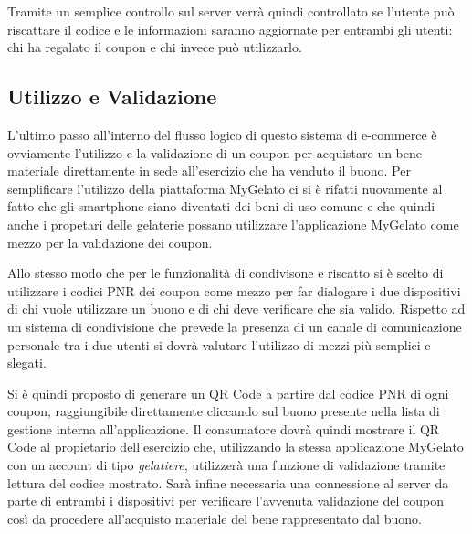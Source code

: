 Tramite un semplice controllo sul server verrà quindi controllato
se l'utente può riscattare il codice e le informazioni saranno aggiornate
per entrambi gli utenti: chi ha regalato il coupon e chi invece può
utilizzarlo.

\subsection{Utilizzo e Validazione}

L'ultimo passo all'interno del flusso logico di questo sistema di
e-commerce è ovviamente l'utilizzo e la validazione di un coupon per
acquistare un bene materiale direttamente in sede all'esercizio che
ha venduto il buono. Per semplificare l'utilizzo della piattaforma
MyGelato ci si è rifatti nuovamente al fatto che gli smartphone siano
diventati dei beni di uso comune e che quindi anche i propetari delle
gelaterie possano utilizzare l'applicazione MyGelato come mezzo per
la validazione dei coupon.\bigskip{}

Allo stesso modo che per le funzionalità di condivisone e riscatto
si è scelto di utilizzare i codici PNR dei coupon come mezzo per far
dialogare i due dispositivi di chi vuole utilizzare un buono e di
chi deve verificare che sia valido. Rispetto ad un sistema di condivisione
che prevede la presenza di un canale di comunicazione personale tra
i due utenti si dovrà valutare l'utilizzo di mezzi più semplici e
slegati.

Si è quindi proposto di generare un QR Code a partire dal codice PNR
di ogni coupon, raggiungibile direttamente cliccando sul buono presente
nella lista di gestione interna all'applicazione. Il consumatore dovrà
quindi mostrare il QR Code al propietario dell'esercizio che, utilizzando
la stessa applicazione MyGelato con un account di tipo \emph{gelatiere},
utilizzerà una funzione di validazione tramite lettura del codice
mostrato. Sarà infine necessaria una connessione al server da parte
di entrambi i dispositivi per verificare l'avvenuta validazione del
coupon così da procedere all'acquisto materiale del bene rappresentato
dal buono.

\newpage{}
